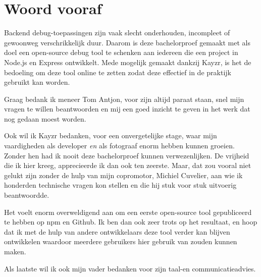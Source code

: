 
\chapter*{Woord vooraf}
\label{ch:voorwoord}


Backend debug-toepassingen zijn vaak slecht onderhouden, incompleet of gewoonweg verschrikkelijk duur. Daarom is deze bachelorproef gemaakt met als doel een open-source debug tool te schenken aan iedereen die een project in Node.js en Express ontwikkelt. Mede mogelijk gemaakt dankzij Kayzr, is het de bedoeling om deze tool online te zetten zodat deze effectief in de praktijk gebruikt kan worden. 

Graag bedank ik meneer Tom Antjon, voor zijn altijd paraat staan, snel mijn vragen te willen beantwoorden en mij een goed inzicht te geven in het werk dat nog gedaan moest worden.

Ook wil ik Kayzr bedanken, voor een onvergetelijke stage, waar mijn vaardigheden als developer \textit{en} als fotograaf enorm hebben kunnen groeien. Zonder hen had ik nooit deze bachelorproef kunnen verwezenlijken. De vrijheid die ik hier kreeg, apprecieerde ik dan ook ten zeerste. Maar, dat zou vooral niet gelukt zijn zonder de hulp van mijn copromotor, Michiel Cuvelier, aan wie ik honderden technische vragen kon stellen en die hij stuk voor stuk uitvoerig beantwoordde. 

Het voelt enorm overweldigend aan  om een eerste open-source tool gepubliceerd te hebben op npm en Github. Ik ben dan ook zeer trots op het resultaat, en hoop dat ik met de hulp van andere ontwikkelaars deze tool verder kan blijven ontwikkelen waardoor meerdere gebruikers hier gebruik van zouden kunnen maken. 

Als laatste wil ik ook mijn vader bedanken voor zijn taal-en communicatieadvies.

